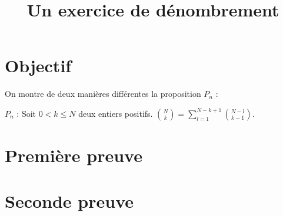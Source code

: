\documentclass{article}
\begin{document}
\title{Un exercice de dénombrement}

\maketitle

\section{Objectif}

On montre de deux manières différentes la proposition $P_n$ :\newline

$P_n$ : Soit $0<k \leq N $ deux entiers positifs. ${N \choose k} = \sum_{l=1}^{N-k+1} {N-l \choose k-1}$.

\section{Première preuve}

\section{Seconde preuve}
\end{document}
